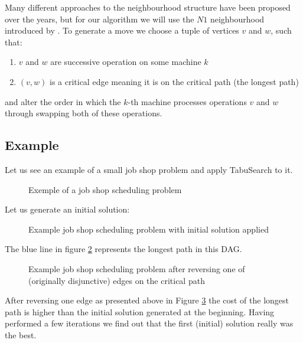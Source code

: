 \documentclass[14pt]{article}
\begin{document}
Many different approaches to the neighbourhood structure have been proposed over the years, but for our algorithm we will use the $N1$ neighbourhood introduced by \citet[section 3.3]{laarhoven}.
To generate a move we choose a tuple of vertices $v$ and $w$, such that:
\begin{enumerate}
  \item $v$ and $w$ are successive operation on some machine $k$
  \item $(v,w)$ is a critical edge meaning it is on the critical path (the longest path)
\end{enumerate}
and alter the order in which the $k$-th machine processes operations $v$ and $w$ through swapping both of these operations.

\subsection{Example}

Let us see an example of a small job shop problem and apply TabuSearch to it.

\begin{figure}[H]
  \centering
  \def\svgwidth{0.5\columnwidth}
  
  \caption{Exemple of a job shop scheduling problem}
  \label{ts-sol-1}
\end{figure}

Let us generate an initial solution:

\begin{figure}[H]
  \centering
  \def\svgwidth{0.5\columnwidth}
  
  \caption{Example job shop scheduling problem with initial solution applied}
  \label{ts-sol-2}
\end{figure}

The blue line in figure \ref{ts-sol-2} represents the longest path in this DAG.

\begin{figure}[H]
  \centering
  \def\svgwidth{0.5\columnwidth}
  
  \caption{Example job shop scheduling problem after reversing one of (originally disjunctive) edges on the critical path}
  \label{ts-sol-3}
\end{figure}

After reversing one edge as presented above in Figure \ref{ts-sol-3} the cost of the longest path is higher than the initial solution generated at the beginning.
Having performed a few iterations we find out that the first (initial) solution really was the best.
\end{document}
